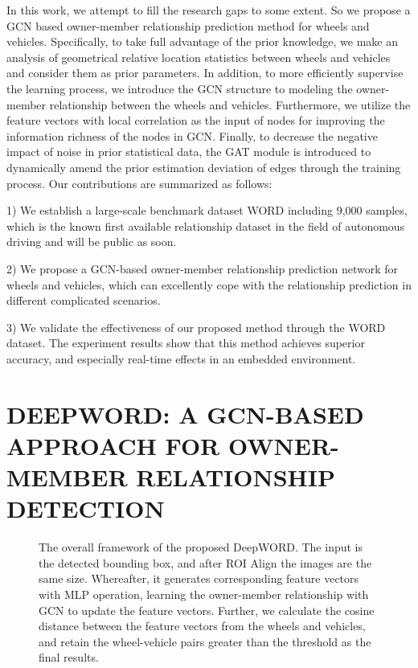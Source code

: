 \documentclass{article}
\begin{document}
In this work, we attempt to fill the research gaps to some extent. So we propose a GCN based owner-member relationship prediction method for wheels and vehicles. Specifically, to take full advantage of the prior knowledge, we make an analysis of geometrical relative location statistics between wheels and vehicles and consider them as prior parameters. In addition, to more efficiently supervise the learning process, we introduce the GCN structure to modeling the owner-member relationship between the wheels and vehicles. Furthermore, we utilize the feature vectors with local correlation as the input of nodes for improving the information richness of the nodes in GCN. Finally, to decrease the negative impact of noise in prior statistical data, the GAT \cite{article11} module is introduced to dynamically amend the prior estimation deviation of edges through the training process. Our contributions are summarized as follows:

1) We establish a large-scale benchmark dataset WORD including 9,000 samples, which is the known first available relationship dataset in the field of autonomous driving and will be public as soon.

2) We propose a GCN-based owner-member relationship prediction network for wheels and vehicles, which can excellently cope with the relationship prediction in different complicated scenarios.

3) We validate the effectiveness of our proposed method through the WORD dataset. The experiment results show that this method achieves superior accuracy, and especially real-time effects in an embedded environment.


\section{DEEPWORD: A GCN-BASED APPROACH FOR OWNER-MEMBER RELATIONSHIP DETECTION}
% 
\begin{figure*}[!t]
    \centering
    \caption{The overall framework of the proposed DeepWORD. The input is the detected bounding box, and after ROI Align the images are the same size. Whereafter, it generates corresponding feature vectors with MLP operation, learning the owner-member relationship with GCN to update the feature vectors. Further, we calculate the cosine distance between the feature vectors from the wheels and vehicles, and retain the wheel-vehicle pairs greater than the threshold as the final results.}
    \label{fig:Figure03}
\end{figure*}
\end{document}
